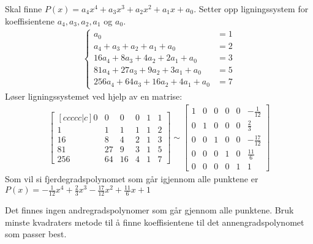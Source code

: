 \documentclass[11pt, a4paper, norsk]{NTNUoving}
\begin{document}
\begin{oppgave}
\begin{punkt}
           Skal finne $P(x) = a_4x^4 + a_3x^3 + a_2x^2 + a_1x + a_0$. Setter opp ligningssystem for koeffisientene $a_4, a_3, a_2, a_1$ og $a_0$.
           \begin{align*}
               \begin{cases}
                   a_0 &= 1 \\
                   a_4 + a_3 + a_2 + a_1 + a_0 &= 2 \\
                   16a_4 + 8a_3 + 4a_2 + 2a_1 + a_0 &= 3 \\
                   81a_4 + 27a_3 + 9a_2 + 3a_1 + a_0 &= 5 \\
                   256a_4 + 64a_3 + 16a_2 + 4a_1 + a_0 &= 7
               \end{cases}
           \end{align*}
           Løser ligningssystemet ved hjelp av en matrise:
           \begin{align*}
               \begin{bmatrix}[ccccc|c]
                   0 & 0 & 0 & 0 & 1 & 1 \\
                   1 & 1 & 1 & 1 & 1 & 2\\
                   16 & 8 & 4 & 2 & 1 & 3 \\
                   81 & 27 & 9 & 3 & 1& 5 \\
                   256 & 64 & 16 & 4 & 1 & 7
               \end{bmatrix} \sim \begin{bmatrix}
                   1 & 0 & 0 & 0 & 0 & -\frac{1}{12} \\
                   0 & 1 & 0 & 0 & 0 & \frac{2}{3} \\
                   0 & 0 & 1 & 0 & 0 & -\frac{17}{12} \\
                   0 & 0 & 0 & 1 & 0 & \frac{11}{6} \\
                   0 & 0 & 0 & 0 & 1 & 1
               \end{bmatrix}
           \end{align*}
           Som vil si fjerdegradspolynomet som går igjennom alle punktene er $P(x) = -\frac{1}{12}x^4 + \frac{2}{3}x^3 -\frac{17}{12}x^2 + \frac{11}{6}x + 1$
       \end{punkt}
       \begin{punkt}
           Det finnes ingen andregradspolynomer som går gjennom alle punktene. Bruk minste kvadraters metode til å finne koeffisientene til det annengradspolynomet som passer best.


\end{punkt}
\end{oppgave}
\end{document}
